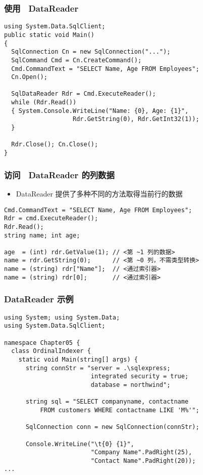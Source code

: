 \begin{frame}[fragile]
\frametitle{使用 ~DataReader}
\begin{lstlisting}
using System.Data.SqlClient;
public static void Main()
{ 
  SqlConnection Cn = new SqlConnection("...");
  SqlCommand Cmd = Cn.CreateCommand();
  Cmd.CommandText = "SELECT Name, Age FROM Employees";
  Cn.Open();

  SqlDataReader Rdr = Cmd.ExecuteReader();
  while (Rdr.Read())
  { System.Console.WriteLine("Name: {0}, Age: {1}",
                   Rdr.GetString(0), Rdr.GetInt32(1));
  }

  Rdr.Close(); Cn.Close();
}
\end{lstlisting}
\end{frame}

\begin{frame}[fragile]
\frametitle{访问 ~DataReader 的列数据}
\begin{itemize}
\item DataReader 提供了多种不同的方法取得当前行的数据
\end{itemize}
\begin{lstlisting}[escapeinside=<>]
Cmd.CommandText = "SELECT Name, Age FROM Employees";
Rdr = cmd.ExecuteReader();
Rdr.Read();
string name; int age;

age  = (int) rdr.GetValue(1); // <第 ~1 列的数据>
name = rdr.GetString(0);      // <第 ~0 列，不需类型转换>
name = (string) rdr["Name"];  // <通过索引器>
name = (string) rdr[0];       // <通过索引器>

\end{lstlisting}
\end{frame}

\begin{frame}[fragile]
\frametitle{DataReader 示例}
\begin{lstlisting}
using System; using System.Data;
using System.Data.SqlClient;

namespace Chapter05 {
  class OrdinalIndexer {
    static void Main(string[] args) {
      string connStr = "server = .\sqlexpress;
                        integrated security = true;
                        database = northwind";

      string sql = "SELECT companyname, contactname
          FROM customers WHERE contactname LIKE 'M%'";

      SqlConnection conn = new SqlConnection(connStr);

      Console.WriteLine("\t{0} {1}",
                        "Company Name".PadRight(25),
                        "Contact Name".PadRight(20));
...
\end{lstlisting}
\end{frame}

